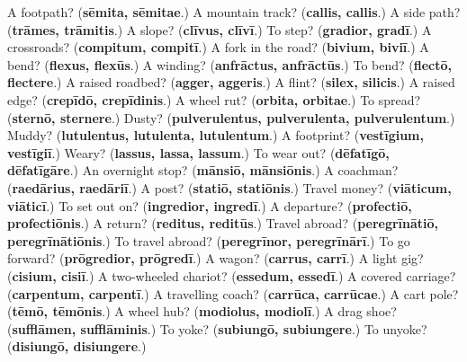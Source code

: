 \begin{tcolorbox}[breakable,colback=teal!4,colframe=teal!35!black,title={Before you move on}]
A footpath? (\textbf{sēmita, sēmitae}.) A mountain track? (\textbf{callis, callis}.) A side path? (\textbf{trāmes, trāmitis}.) A slope? (\textbf{clīvus, clīvī}.) To step? (\textbf{gradior, gradī}.) A crossroads? (\textbf{compitum, compitī}.) A fork in the road? (\textbf{bivium, biviī}.) A bend? (\textbf{flexus, flexūs}.) A winding? (\textbf{anfrāctus, anfrāctūs}.) To bend? (\textbf{flectō, flectere}.) A raised roadbed? (\textbf{agger, aggeris}.) A flint? (\textbf{silex, silicis}.) A raised edge? (\textbf{crepīdō, crepīdinis}.) A wheel rut? (\textbf{orbita, orbitae}.) To spread? (\textbf{sternō, sternere}.) Dusty? (\textbf{pulverulentus, pulverulenta, pulverulentum}.) Muddy? (\textbf{lutulentus, lutulenta, lutulentum}.) A footprint? (\textbf{vestīgium, vestīgiī}.) Weary? (\textbf{lassus, lassa, lassum}.) To wear out? (\textbf{dēfatīgō, dēfatīgāre}.) An overnight stop? (\textbf{mānsiō, mānsiōnis}.) A coachman? (\textbf{raedārius, raedāriī}.) A post? (\textbf{statiō, statiōnis}.) Travel money? (\textbf{viāticum, viāticī}.) To set out on? (\textbf{ingredior, ingredī}.) A departure? (\textbf{profectiō, profectiōnis}.) A return? (\textbf{reditus, reditūs}.) Travel abroad? (\textbf{peregrīnātiō, peregrīnātiōnis}.) To travel abroad? (\textbf{peregrīnor, peregrīnārī}.) To go forward? (\textbf{prōgredior, prōgredī}.) A wagon? (\textbf{carrus, carrī}.) A light gig? (\textbf{cisium, cisiī}.) A two-wheeled chariot? (\textbf{essedum, essedī}.) A covered carriage? (\textbf{carpentum, carpentī}.) A travelling coach? (\textbf{carrūca, carrūcae}.) A cart pole? (\textbf{tēmō, tēmōnis}.) A wheel hub? (\textbf{modiolus, modiolī}.) A drag shoe? (\textbf{sufflāmen, sufflāminis}.) To yoke? (\textbf{subiungō, subiungere}.) To unyoke? (\textbf{disiungō, disiungere}.)
\end{tcolorbox}
